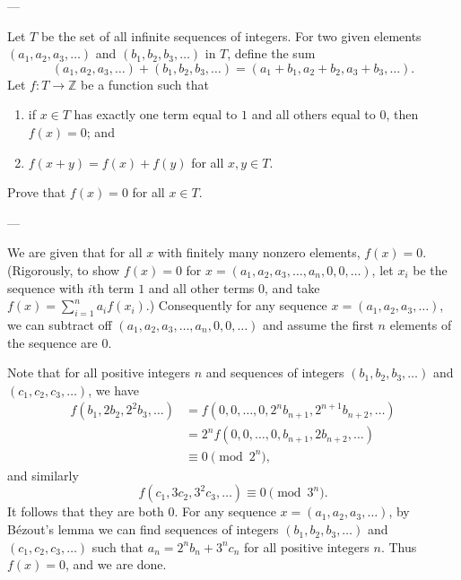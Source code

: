 
---

Let $T$ be the set of all infinite sequences of integers. For two given elements $(a_1,a_2,a_3,\ldots)$ and $(b_1,b_2,b_3,\ldots)$ in $T$, define the sum \[(a_1,a_2,a_3,\ldots)+(b_1,b_2,b_3,\ldots)=(a_1+b_1,a_2+b_2,a_3+b_3,\ldots).\]
Let $f:T\to\mathbb Z$ be a function such that
\begin{enumerate}[label=(\roman*),itemsep=0em]
    \item if $x\in T$ has exactly one term equal to $1$ and all others equal to $0$, then $f(x)=0$; and
    \item $f(x+y)=f(x)+f(y)$ for all $x,y\in T$.
\end{enumerate}
Prove that $f(x)=0$ for all $x\in T$.

---

We are given that for all $x$ with finitely many nonzero elements, $f(x)=0$. (Rigorously, to show $f(x)=0$ for $x=(a_1,a_2,a_3,\ldots,a_n,0,0,\ldots)$, let $x_i$ be the sequence with $i$th term $1$ and all other terms $0$, and take $f(x)=\sum_{i=1}^na_if(x_i)$.) Consequently for any sequence $x=(a_1,a_2,a_3,\ldots)$, we can subtract off $(a_1,a_2,a_3,\ldots,a_n,0,0,\ldots)$ and assume the first $n$ elements of the sequence are $0$.

Note that for all positive integers $n$ and sequences of integers $(b_1,b_2,b_3,\ldots)$ and $(c_1,c_2,c_3,\ldots)$, we have
\begin{align*}
    f(b_1,2b_2,2^2b_3,\ldots)&=f(0,0,\ldots,0,2^nb_{n+1},2^{n+1}b_{n+2},\ldots)\\
    &=2^nf(0,0,\ldots,0,b_{n+1},2b_{n+2},\ldots)\\
    &\equiv0\pmod{2^n},
\end{align*}
and similarly \[f(c_1,3c_2,3^2c_3,\ldots)\equiv0\pmod{3^n}.\]
It follows that they are both $0$.
For any sequence $x=(a_1,a_2,a_3,\ldots)$, by B\'ezout's lemma we can find sequences of integers $(b_1,b_2,b_3,\ldots)$ and $(c_1,c_2,c_3,\ldots)$ such that $a_n=2^nb_n+3^nc_n$ for all positive integers $n$. Thus $f(x)=0$, and we are done.

